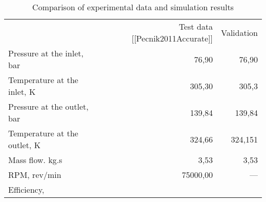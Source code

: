 \begin{table}
\label{tab:Comparison}
\caption{Comparison of experimental data and simulation results}
\begin{center}
\begin{tabulary}{0.9\textwidth}{LRR}

	&	Test data [[Pecnik2011Accurate]]	&	Validation	\\
Pressure at the inlet, bar	&	76,90	&	76,90	\\
Temperature at the inlet, K	&	305,30	&	305,3	\\
Pressure at the outlet, bar	&	139,84	&	139,84	\\
Temperature at the outlet, K	&	324,66	&	324,151	\\
Mass flow. kg.s	&	3,53	&	3,53	\\
RPM, rev/min	&	75000,00	&	—	\\
Efficiency, %

\end{tabulary}
\end{center}
\end{table}